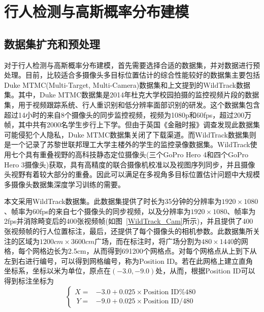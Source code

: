 
\chapter{行人检测与高斯概率分布建模}

\section{数据集扩充和预处理}

对于行人检测与高斯概率分布建模，首先需要选择合适的数据集，并对数据进行预处理。目前，比较适合多摄像头多目标位置估计的综合性能较好的数据集主要包括Duke MTMC(Multi-Target, Multi-Camera)数据集\cite{Ristani2016PerformanceMA}和上文提到的WildTrack数据集。其中，Duke MTMC数据集是2014年杜克大学校园拍摄的监控视频片段的数据集，用于视频跟踪系统、行人重识别和低分辨率面部识别的研发。这个数据集包含超过14小时的来自8个摄像头的同步监控视频，视频为1080p和60fps，超过200万帧，其中共有2000名学生步行上下学。但由于英国《金融时报》调查发现此数据集可能侵犯个人隐私，Duke MTMC数据集关闭了下载渠道。而WildTrack数据集则是一个记录了苏黎世联邦理工大学主楼外的学生的监控录像数据集。WildTrack使用七个具有重叠视野的高科技静态定位摄像头(三个GoPro Hero 4和四个GoPro Hero 3摄像头)获取，具有高精度的联合摄像机校准以及视图序列同步，并且摄像头视野有着较大部分的重叠。因此可以满足在多视角多目标位置估计问题中大规模多摄像头数据集深度学习训练的需要。

本文采用WildTrack数据集。此数据集提供了时长为35分钟的分辨率为$1920\times1080$、帧率为60fps的来自七个摄像头的同步视频，以及分辨率为$1920\times1080$、帧率为2fps并消除畸变后的400张视频帧(如图~\ref{WildTrack_Cam}所示)，并且提供了400张视频帧的行人位置标注，最后，还提供了每个摄像头的相机参数。此数据集所关注的区域为$1200cm\times3600cm$广场，而在标注时，将广场分割为$480\times1440$的网格，每个网格边长为2.5cm，从而得到691200个网格点。对每个网格点从上到下从左到右进行编号，可以得到网格编号，称为Position ID。若在此网格上建立直角坐标系，坐标以米为单位，原点在$(-3.0, -9.0)$处，从而，根据Position ID可以得到标注坐标为
\begin{equation*}
  \left\{
    \begin{aligned}
    X = & -3.0 + 0.025 \times \text{Position ID} \% 480 \\\
    Y = & -9.0 + 0.025 \times \text{Position ID} / 480
    \end{aligned}
  \right.
\end{equation*}


